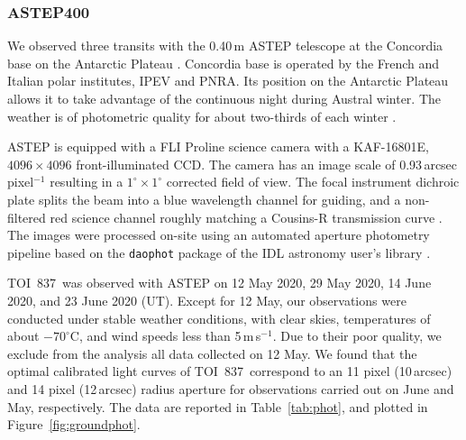 \documentclass[12pt,twocolumn,tighten]{aastex63}
\newcommand{\tn}{TOI~837} %
\begin{document}


\subsubsection{ASTEP400}

We observed three transits with the 0.40$\,$m ASTEP telescope at the
Concordia base on the Antarctic Plateau \citep{daban_astep_2010}.
Concordia base is operated by the French and Italian polar
institutes, IPEV and PNRA.  Its position on the Antarctic Plateau
allows it to take advantage of the continuous night during Austral
winter.  The weather is of photometric quality for about two-thirds of
each winter \citep{crouzet_four_2018}.

ASTEP is equipped with a FLI Proline science camera with a KAF-16801E,
$4096\times4096$ front-illuminated CCD. The camera has an image scale
of 0.93\,arcsec pixel$^{-1}$ resulting in a $1^{\circ}\times1^{\circ}$
corrected field of view. The focal instrument dichroic plate splits
the beam into a blue wavelength channel for guiding, and a
non-filtered red science channel roughly matching a Cousins-R
transmission curve
\citep{abe_secondary_2013,mekarnia_transiting_2016}.  The images were
processed on-site using an automated aperture  photometry pipeline
based on the \texttt{daophot} package of the IDL astronomy user's
library \citep{landsman_1995}.

\tn\ was observed with ASTEP on 12 May 2020, 29 May 2020, 14 June
2020, and 23 June 2020 (UT).  Except for
12 May, our observations were conducted under stable weather
conditions, with clear skies, temperatures of about $-70^\circ$C, and
wind speeds less than 5\,m$\,$s$^{-1}$. Due to their poor quality, we
exclude from the analysis all data collected on 12 May. We found that
the optimal calibrated light curves of \tn\ correspond to an 11 pixel
(10\,arcsec) and 14 pixel (12\,arcsec) radius aperture for
observations carried out on June and May, respectively.  The data are
reported in Table~\ref{tab:phot}, and plotted in
Figure~\ref{fig:groundphot}.
\end{document}
